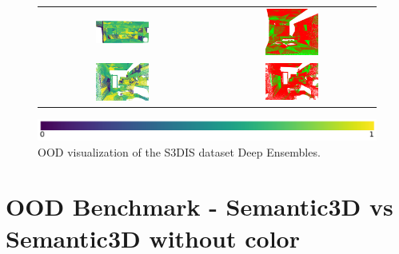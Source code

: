 \begin{figure}[h!]
\begin{tabular}{cc}
                \includegraphics[width=0.33\textwidth, height=0.18\textheight]{images/ood_imgs/fout_s3dis/pnt_1_fout_ent.png}& 
                \includegraphics[width=0.33\textwidth, height=0.18\textheight]{images/ood_imgs/fout_s3dis/fout_ent_3.png}\\
    
                \includegraphics[width=0.33\textwidth, height=0.18\textheight]{images/ood_imgs/fout_s3dis/ofc_42_fout_ent.png}& 
                \includegraphics[width=0.33\textwidth, height=0.18\textheight]{images/ood_imgs/fout_s3dis/fout_ent_1.png}\\
            \end{tabular}
            \includegraphics[scale=0.45]{images/prob_legend.pdf}
            \caption{OOD visualization of the S3DIS dataset Deep Ensembles.}
            \label{fig:fout_s3dis_oodmap_ent}
        \end{figure}
        \FloatBarrier


    \section{OOD Benchmark - Semantic3D vs Semantic3D without color}

